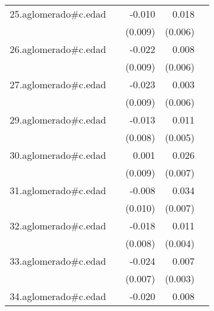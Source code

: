 {\begin{longtable}{l*{4}{D{.}{.}{-1}}}
\addlinespace
25.aglomerado#c.edad&                     &      -0.010         &       0.018\sym{**} &                     \\
            &                     &     (0.009)         &     (0.006)         &                     \\
\addlinespace
26.aglomerado#c.edad&                     &      -0.022\sym{*}  &       0.008         &                     \\
            &                     &     (0.009)         &     (0.006)         &                     \\
\addlinespace
27.aglomerado#c.edad&                     &      -0.023\sym{*}  &       0.003         &                     \\
            &                     &     (0.009)         &     (0.006)         &                     \\
\addlinespace
29.aglomerado#c.edad&                     &      -0.013         &       0.011\sym{*}  &                     \\
            &                     &     (0.008)         &     (0.005)         &                     \\
\addlinespace
30.aglomerado#c.edad&                     &       0.001         &       0.026\sym{***}&                     \\
            &                     &     (0.009)         &     (0.007)         &                     \\
\addlinespace
31.aglomerado#c.edad&                     &      -0.008         &       0.034\sym{***}&                     \\
            &                     &     (0.010)         &     (0.007)         &                     \\
\addlinespace
32.aglomerado#c.edad&                     &      -0.018\sym{*}  &       0.011\sym{*}  &                     \\
            &                     &     (0.008)         &     (0.004)         &                     \\
\addlinespace
33.aglomerado#c.edad&                     &      -0.024\sym{***}&       0.007\sym{**} &                     \\
            &                     &     (0.007)         &     (0.003)         &                     \\
\addlinespace
34.aglomerado#c.edad&                     &      -0.020\sym{*}  &       0.008         &                     \\

\end{longtable}}
